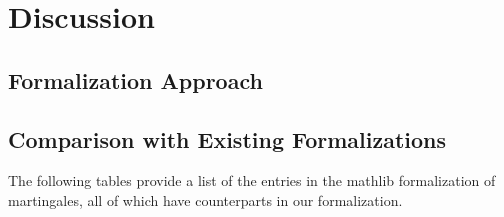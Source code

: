
\chapter{Discussion}\label{chapter:discussion}

\section{Formalization Approach}

\section{Comparison with Existing Formalizations}

The following tables provide a list of the entries in the \textsf{mathlib} formalization of martingales, all of which have counterparts in our formalization.

